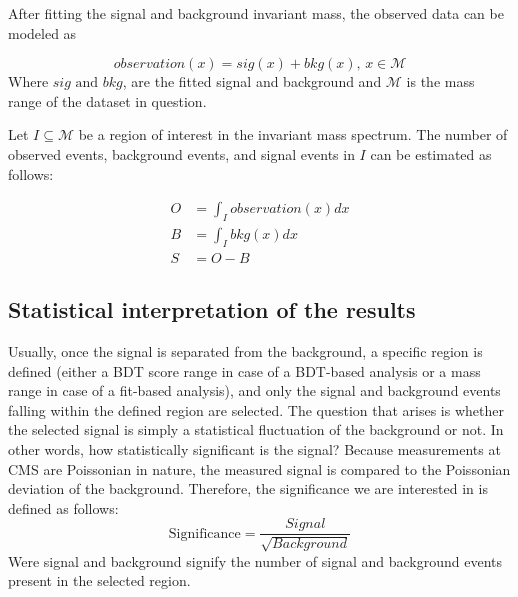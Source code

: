 After fitting the signal and background invariant mass, the observed data can be modeled as

\begin{equation}
observation(x) = sig(x) + bkg(x)\text{, }x\in \mathcal{M}
\end{equation}
Where \(sig\text{ and }bkg\), are the fitted signal and background and \(\mathcal{M}\) is the mass range of the dataset in question.

Let \(I\subseteq \mathcal{M}\) be a region of interest in the invariant mass spectrum. The number of observed events, background events, and signal events in \(I\) can be estimated as follows:

\begin{align}
O &= \int_{I} observation(x) dx \\
B &= \int_{I} bkg(x) dx\\
S &= O - B
\end{align}


\subsection{Statistical interpretation of the results}
\label{sec:org1cfc88b}
Usually, once the signal is separated from the background, a specific region is defined (either a BDT score range in case of a BDT-based analysis or a mass range in case of a fit-based analysis), and only the signal and background events falling within the defined region are selected. The question that arises is whether the selected signal is simply a statistical fluctuation of the background or not. In other words, how statistically significant is the signal? Because measurements at CMS are Poissonian in nature, the measured signal is compared to the Poissonian deviation of the background. Therefore, the significance we are interested in is defined as follows:
\begin{equation}
\text{Significance} = \frac{Signal}{\sqrt{Background}}
\end{equation}
Were signal and background signify the number of signal and background events present in the selected region.  
